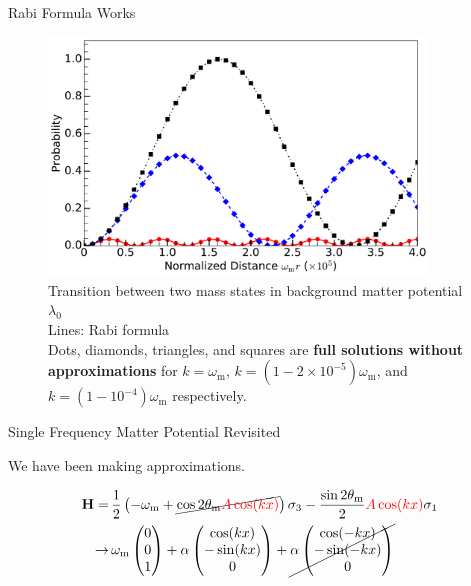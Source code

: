 \documentclass[9pt]{beamer}
\begin{document}
\begin{darkframes}
\begin{frame}{Rabi Formula Works}
\begin{tcolorbox}
\begin{figure}
\includegraphics[width=0.9\textwidth]{assets/rabiOscillationsNeutrinoCoincidence-single-frequency}
\caption*{
\color{black}Transition between two mass states in background matter potential $\lambda_0$\\
Lines: Rabi formula\\
Dots, diamonds, triangles, and squares are {\bf full solutions without approximations} for {\color{black}$k=\omega_{\mathrm m}$}, {\color{blue}$k=(1-2\times 10^{-5})\omega_{\mathrm m}$}, and {\color{red}$k=(1-10^{-4})\omega_{\mathrm m}$} respectively.
}
\end{figure}
\end{tcolorbox}

\end{frame}





\begin{frame}{Single Frequency Matter Potential Revisited}

We have been making approximations.


\begin{align*}
    \mathbf {H} =\,& \frac{1}{2}\left( - \omega_{\mathrm{m}}
    +\cancel{
     \cos 2\theta_{\mathrm{m}}{\color{red}A\cos(kx)} } \right) \sigma_3 - \frac{  \sin 2\theta_{\mathrm{m}
    }
    }{2}{\color{red}A \cos(kx)}  \sigma_1 \\
    \to\, &  \omega_{\mathrm m}\begin{pmatrix}
    0\\
    0\\
    1
    \end{pmatrix} + \alpha \begin{pmatrix}
    \cos (kx)\\
    -\sin(k x)\\
    0
    \end{pmatrix}  + \cancel{\alpha \begin{pmatrix}
    \cos (-kx)\\
    -\sin( - k x)\\
    0
    \end{pmatrix}
    }
\end{align*}



\end{frame}
\end{darkframes}
\end{document}

